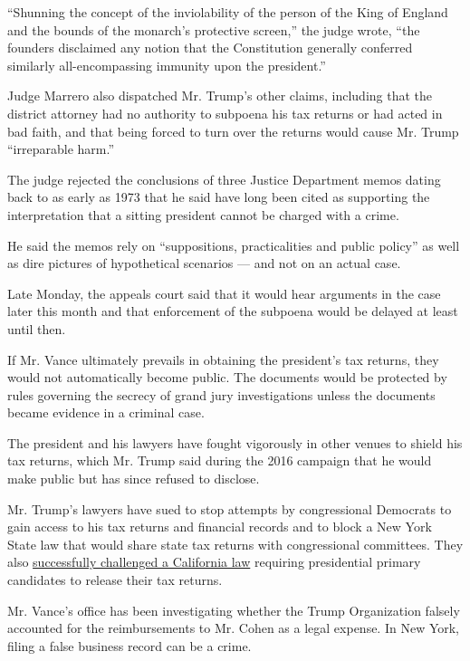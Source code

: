 ``Shunning the concept of the inviolability of the person of the King of
England and the bounds of the monarch's protective screen,'' the judge
wrote, ``the founders disclaimed any notion that the Constitution
generally conferred similarly all-encompassing immunity upon the
president.''

Judge Marrero also dispatched Mr. Trump's other claims, including that
the district attorney had no authority to subpoena his tax returns or
had acted in bad faith, and that being forced to turn over the returns
would cause Mr. Trump ``irreparable harm.''

The judge rejected the conclusions of three Justice Department memos
dating back to as early as 1973 that he said have long been cited as
supporting the interpretation that a sitting president cannot be charged
with a crime.

He said the memos rely on ``suppositions, practicalities and public
policy'' as well as dire pictures of hypothetical scenarios --- and not
on an actual case.

Late Monday, the appeals court said that it would hear arguments in the
case later this month and that enforcement of the subpoena would be
delayed at least until then.

If Mr. Vance ultimately prevails in obtaining the president's tax
returns, they would not automatically become public. The documents would
be protected by rules governing the secrecy of grand jury investigations
unless the documents became evidence in a criminal case.

The president and his lawyers have fought vigorously in other venues to
shield his tax returns, which Mr. Trump said during the 2016 campaign
that he would make public but has since refused to disclose.

Mr. Trump's lawyers have sued to stop attempts by congressional
Democrats to gain access to his tax returns and financial records and to
block a New York State law that would share state tax returns with
congressional committees. They also
\href{https://www.nytimes3xbfgragh.onion/2019/08/06/us/politics/california-trump-tax-returns.html?module=inline}{successfully
challenged a California law} requiring presidential primary candidates
to release their tax returns.

Mr. Vance's office has been investigating whether the Trump Organization
falsely accounted for the reimbursements to Mr. Cohen as a legal
expense. In New York, filing a false business record can be a crime.

